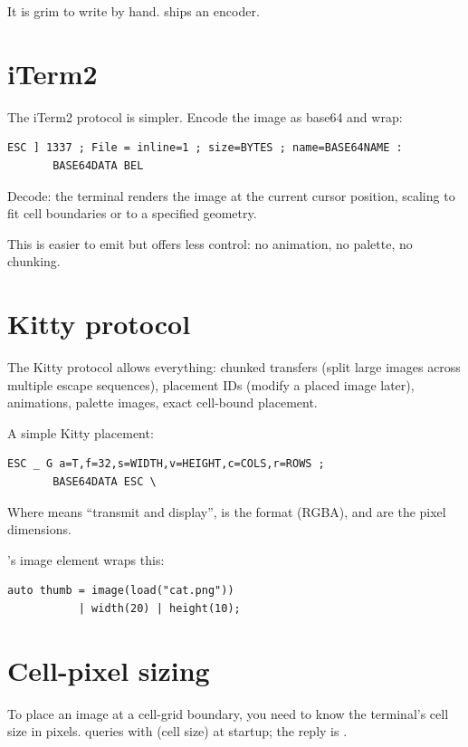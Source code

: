 It is grim to write by hand. \maya{} ships an encoder.

\section{iTerm2}

The iTerm2 protocol is simpler. Encode the image as base64 and
wrap:

\begin{lstlisting}
ESC ] 1337 ; File = inline=1 ; size=BYTES ; name=BASE64NAME :
       BASE64DATA BEL
\end{lstlisting}

Decode: the terminal renders the image at the current cursor
position, scaling to fit cell boundaries or to a specified
geometry.

This is easier to emit but offers less control: no animation,
no palette, no chunking.

\section{Kitty protocol}

The Kitty protocol allows everything: chunked transfers (split
large images across multiple escape sequences), placement IDs
(modify a placed image later), animations, palette images,
exact cell-bound placement.

A simple Kitty placement:

\begin{lstlisting}
ESC _ G a=T,f=32,s=WIDTH,v=HEIGHT,c=COLS,r=ROWS ;
       BASE64DATA ESC \
\end{lstlisting}

Where  means ``transmit and display'', 
is the format (RGBA), and  are the pixel
dimensions.

\maya{}'s image element wraps this:

\begin{lstlisting}
auto thumb = image(load("cat.png"))
           | width(20) | height(10);
\end{lstlisting}

\section{Cell-pixel sizing}

To place an image at a cell-grid boundary, you need to know
the terminal's cell size in pixels. \maya{} queries with
\code{ESC [ 16 t} (cell size) at startup; the reply is
\code{ESC [ 6 ; H ; W t}.

